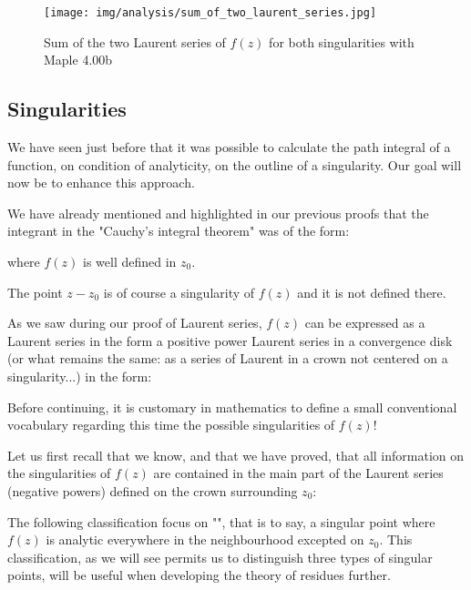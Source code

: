 	\pagebreak
	\begin{tcolorbox}[colframe=black,colback=white,sharp corners]
	\begin{figure}[H]
		\centering
		\texttt{[image: img/analysis/sum\_of\_two\_laurent\_series.jpg]}
		\caption{Sum of the two Laurent series of $f(z)$ for both singularities with Maple 4.00b}
	\end{figure}
	\end{tcolorbox}
	
	\subsection{Singularities}
	We have seen just before that it was possible to calculate the path integral of a function, on condition of analyticity, on the outline of a singularity. Our goal will now be to enhance this approach.
	
	We have already mentioned and highlighted in our previous proofs that the integrant in the "Cauchy's integral theorem" was of the form:
	
	where $f(z)$ is well defined in $z_0$.
	
	The point $z-z_0$ is of course a singularity of $f(z)$ and it is not defined there.
	
	As we saw during our proof of Laurent series, $f(z)$ can be expressed as a Laurent series in the form a positive power Laurent series in a convergence disk (or what remains the same: as a series of Laurent in a crown not centered on a singularity...) in the form:
	
	Before continuing, it is customary in mathematics to define a small conventional vocabulary regarding this time the possible singularities of $f(z)$!
	
	Let us first recall that we know, and that we have proved, that all information on the singularities of $f (z)$ are contained in the main part of the Laurent series (negative powers) defined on the crown surrounding $z_0$:
	
	The following classification focus on "", that is to say, a singular point where $f(z)$ is analytic everywhere in the neighbourhood excepted on $z_0$. This classification, as we will see permits us to distinguish three types of singular points, will be useful when developing the theory of residues further.
	
